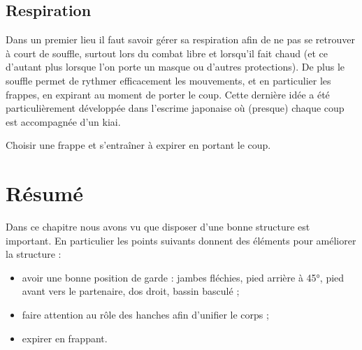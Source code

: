 \subsection{Respiration}


Dans un premier lieu il faut savoir gérer sa respiration afin de ne pas se retrouver à court de souffle, surtout lors du combat libre et lorsqu'il fait chaud (et ce d'autant plus lorsque l'on porte un masque ou d'autres protections).
De plus le souffle permet de rythmer efficacement les mouvements, et en particulier les frappes, en expirant au moment de porter le coup.
Cette dernière idée a été particulièrement développée dans l'escrime japonaise où (presque) chaque coup est accompagnée d'un kiai.


\begin{exercice}

Choisir une frappe et s'entraîner à expirer en portant le coup.

\end{exercice}


\section{Résumé}


Dans ce chapitre nous avons vu que disposer d'une bonne structure est important.
En particulier les points suivants donnent des éléments pour améliorer la structure :
\begin{itemize}
	\item avoir une bonne position de garde : jambes fléchies, pied arrière à 45°, pied avant vers le partenaire, dos droit, bassin basculé ;
	\item faire attention au rôle des hanches afin d'unifier le corps ;
	\item expirer en frappant.
\end{itemize}


